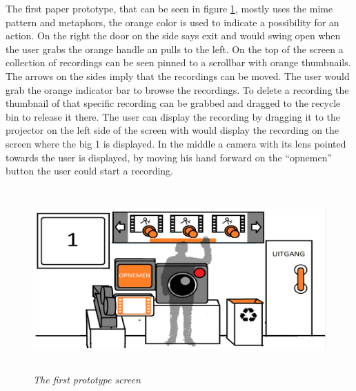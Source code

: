 
The first paper prototype, that can be seen in figure \ref{first prototype}, mostly uses the mime pattern and metaphors, the orange color is used to indicate a possibility for an action. On the right the door on the side says exit and would swing open when the user grabs the orange handle an pulls to the left. On the top of the screen a collection of recordings can be seen pinned to a scrollbar with orange thumbnails. The arrows on the sides imply that the recordings can be moved. The user would grab the orange indicator bar to browse the recordings. To delete a recording the thumbnail of that specific recording can be grabbed and dragged to the recycle bin to release it there. The user can display the recording by dragging it to the projector on the left side of the screen with would display the recording on the screen where the big 1 is displayed. In the middle a camera with its lens pointed towards the user is displayed, by moving his hand forward on the ``opnemen'' button the user could start a recording.

\begin{figure}[H]
	\begin{center}
		\includegraphics[width=12.5cm, height=7cm]{figures/prototype_1_1_standard.png}
		\caption{\emph{The first prototype screen}}
		\label{first prototype}
	\end{center}
\end{figure}

